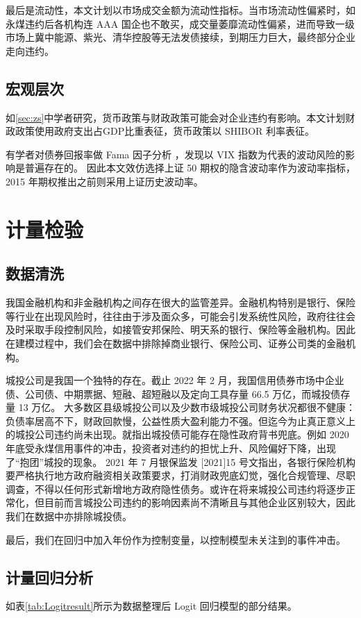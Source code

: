 最后是流动性，本文计划以市场成交金额为流动性指标。当市场流动性偏紧时，如永煤违约后各机构连 AAA 国企也不敢买，成交量萎靡流动性偏紧，进而导致一级市场上冀中能源、紫光、清华控股等无法发债接续，到期压力巨大，最终部分企业走向违约。
\subsection{宏观层次}
如\ref{sec:zs}中学者研究，货币政策与财政政策可能会对企业违约有影响。本文计划财政政策使用政府支出占GDP比重表征，货币政策以 SHIBOR 利率表征。

有学者对债券回报率做 Fama 因子分析
\cite{chung2019volatility}
，发现以 VIX 指数为代表的波动风险的影响是普遍存在的。
因此本文效仿选择上证 50 期权的隐含波动率作为波动率指标，2015 年期权推出之前则采用上证历史波动率。

\section{计量检验}
\subsection{数据清洗}

我国金融机构和非金融机构之间存在很大的监管差异。金融机构特别是银行、保险等行业在出现风险时，往往由于涉及面众多，可能会引发系统性风险，政府往往会及时采取手段控制风险，如接管安邦保险、明天系的银行、保险等金融机构。因此在建模过程中，我们会在数据中排除掉商业银行、保险公司、证券公司类的金融机构。

城投公司是我国一个独特的存在。截止 2022 年 2 月，我国信用债券市场中企业债、公司债、中期票据、短融、超短融以及定向工具存量 66.5 万亿，而城投债存量 13 万亿。
大多数区县级城投公司以及少数市级城投公司财务状况都很不健康：负债率居高不下，财政回款慢，公益性质大盈利能力不强。但迄今为止真正意义上的城投公司违约尚未出现。\Textcite{钟辉勇2016城投债的担保可信吗}就指出城投债可能存在隐性政府背书兜底。例如 2020 年底受永煤信用事件的冲击，投资者对违约的担忧上升、风险偏好下降，出现了“抱团”城投的现象。
2021 年 7 月银保监发 [2021]15 号文指出，各银行保险机构要严格执行地方政府融资相关政策要求，打消财政兜底幻觉，强化合规管理、尽职调查，不得以任何形式新增地方政府隐性债务。或许在将来城投公司违约将逐步正常化，但目前而言城投公司违约的影响因素尚不清晰且与其他企业区别较大，因此我们在数据中亦排除城投债。

最后，我们在回归中加入年份作为控制变量，以控制模型未关注到的事件冲击。

\subsection{计量回归分析}
如表\ref{tab:Logitresult}所示为数据整理后 Logit 回归模型的部分结果。

